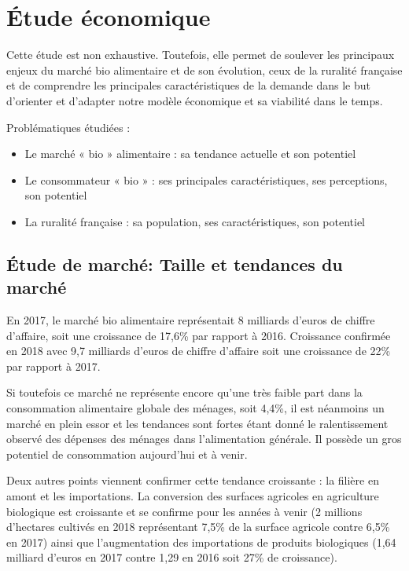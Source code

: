 \documentclass[12pt,a4paper]{report}
\begin{document}
	\chapter{Étude économique}	
	Cette étude est non exhaustive. Toutefois, elle permet de soulever les principaux enjeux du marché bio alimentaire et de son évolution, ceux de la ruralité française et de comprendre les principales caractéristiques de la demande dans le but d’orienter et d’adapter notre modèle économique et sa viabilité dans le temps.
		
		Problématiques étudiées :
		
		\begin{itemize}
				\item Le marché « bio » alimentaire : sa tendance actuelle et son potentiel
				\item Le consommateur « bio » : ses principales caractéristiques, ses perceptions, son potentiel
				\item La ruralité française : sa population, ses caractéristiques, son potentiel
		\end{itemize}
		
		\section{Étude de marché: Taille et tendances du marché}
			
			
				
		En 2017, le marché bio alimentaire représentait 8 milliards d’euros de chiffre d’affaire, soit une croissance de 17,6\% par rapport à 2016. Croissance confirmée en 2018 avec 9,7 milliards d’euros de chiffre d’affaire soit une croissance de 22\% par rapport à 2017.
		
		Si toutefois ce marché ne représente encore qu’une très faible part dans la consommation alimentaire globale des ménages, soit 4,4\%, il est néanmoins un marché en plein essor et les tendances sont fortes étant donné le ralentissement observé des dépenses des ménages dans l’alimentation générale. Il possède un gros potentiel de consommation aujourd'hui et à venir.
		
		Deux autres points viennent confirmer cette tendance croissante : la filière en amont et les importations. La conversion des surfaces agricoles en agriculture biologique est croissante et se confirme pour les années à venir (2 millions d’hectares cultivés en 2018 représentant 7,5\% de la surface agricole contre 6,5\% en 2017) ainsi que l’augmentation des importations de produits biologiques (1,64 milliard d’euros en 2017 contre 1,29 en 2016 soit 27\% de croissance).
		
\end{document}
